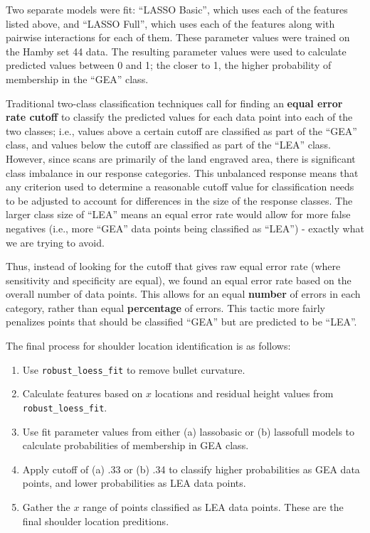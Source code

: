 \documentclass[12pt]{article}
\begin{document}
Two separate models were fit: ``LASSO Basic'', which uses each of the
features listed above, and ``LASSO Full'', which uses each of the
features along with pairwise interactions for each of them. These
parameter values were trained on the Hamby set 44 data. The resulting
parameter values were used to calculate predicted values between 0 and
1; the closer to 1, the higher probability of membership in the ``GEA''
class.

Traditional two-class classification techniques call for finding an
\textbf{equal error rate cutoff} to classify the predicted values for
each data point into each of the two classes; i.e., values above a
certain cutoff are classified as part of the ``GEA'' class, and values
below the cutoff are classified as part of the ``LEA'' class. However,
since scans are primarily of the land engraved area, there is
significant class imbalance in our response categories. This unbalanced
response means that any criterion used to determine a reasonable cutoff
value for classification needs to be adjusted to account for differences
in the size of the response classes. The larger class size of ``LEA''
means an equal error rate would allow for more false negatives (i.e.,
more ``GEA'' data points being classified as ``LEA'') - exactly what we
are trying to avoid.

Thus, instead of looking for the cutoff that gives raw equal error rate
(where sensitivity and specificity are equal), we found an equal error
rate based on the overall number of data points. This allows for an
equal \textbf{number} of errors in each category, rather than equal
\textbf{percentage} of errors. This tactic more fairly penalizes points
that should be classified ``GEA'' but are predicted to be ``LEA''.

The final process for shoulder location identification is as follows:

\begin{enumerate}
\item Use \texttt{robust\_loess\_fit} to remove bullet curvature.
\item Calculate features based on $x$ locations and residual height values from \texttt{robust\_loess\_fit}. 
\item Use fit parameter values from either (a) lassobasic or (b) lassofull models to calculate probabilities of membership in GEA class.
\item Apply cutoff of (a) .33 or (b) .34 to classify higher probabilities as GEA data points, and lower probabilities as LEA data points.
\item Gather the $x$ range of points classified as LEA data points. These are the final shoulder location preditions.  
\end{enumerate}
\end{document}
